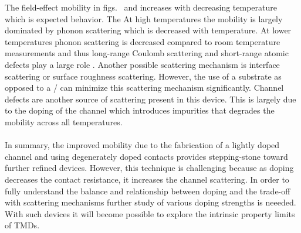 \noindent The field-effect mobility in figs.~ and  increases with decreasing temperature which is expected behavior. The  At high temperatures the mobility is largely dominated by phonon scattering which is decreased with temperature. At lower temperatures phonon scattering is decreased compared to room temperature measurements and thus long-range Coulomb scattering and short-range atomic defects play a large role \cite{Ando_RevModPhys1982}. Another possible scattering mechanism is interface scattering or surface roughness scattering. However, the use of a \hbn substrate as opposed to a / can minimize this scattering mechanism significantly. Channel defects are another source of scattering present in this device. This is largely due to the doping of the  channel which introduces impurities that degrades the mobility across all temperatures. \\ \\

\noindent In summary, the improved mobility due to the fabrication of a lightly doped channel and using degenerately doped contacts provides stepping-stone toward further refined devices. However, this technique is challenging because as doping decreases the contact resistance, it increases the channel scattering. In order to fully understand the balance and relationship between doping and the trade-off with scattering mechanisms further study of various doping strengths is neeeded. With such devices it will become possible to explore the intrinsic property limits of \acp{TMD}.
